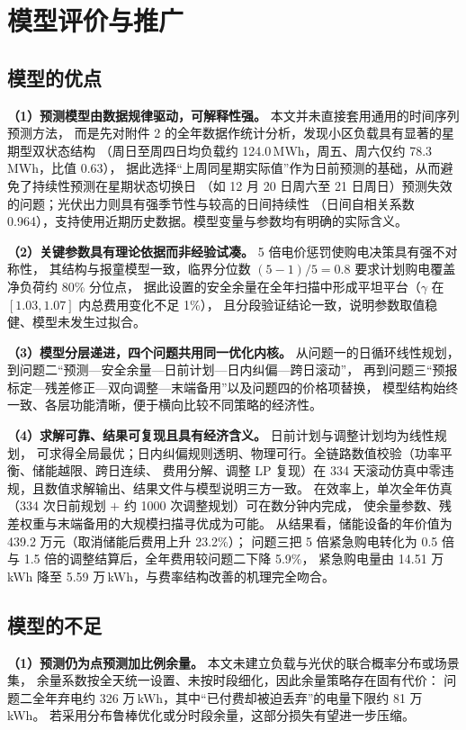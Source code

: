 \section{模型评价与推广}

\subsection{模型的优点}

\textbf{（1）预测模型由数据规律驱动，可解释性强。} 本文并未直接套用通用的时间序列预测方法，
而是先对附件 2 的全年数据作统计分析，发现小区负载具有显著的星期型双状态结构
（周日至周四日均负载约 124.0\,MWh，周五、周六仅约 78.3\,MWh，比值 0.63），
据此选择“上周同星期实际值”作为日前预测的基础，从而避免了持续性预测在星期状态切换日
（如 12 月 20 日周六至 21 日周日）预测失效的问题；光伏出力则具有强季节性与较高的日间持续性
（日间自相关系数 0.964），支持使用近期历史数据。模型变量与参数均有明确的实际含义。

\textbf{（2）关键参数具有理论依据而非经验试凑。} 5 倍电价惩罚使购电决策具有强不对称性，
其结构与报童模型一致，临界分位数 $(5-1)/5=0.8$ 要求计划购电覆盖净负荷约 80\% 分位点，
据此设置的安全余量在全年扫描中形成平坦平台（$\gamma$ 在 $[1.03,1.07]$ 内总费用变化不足 1\%），
且分段验证结论一致，说明参数取值稳健、模型未发生过拟合。

\textbf{（3）模型分层递进，四个问题共用同一优化内核。} 从问题一的日循环线性规划，
到问题二“预测—安全余量—日前计划—日内纠偏—跨日滚动”，
再到问题三“预报标定—残差修正—双向调整—末端备用”以及问题四的价格项替换，
模型结构始终一致、各层功能清晰，便于横向比较不同策略的经济性。

\textbf{（4）求解可靠、结果可复现且具有经济含义。} 日前计划与调整计划均为线性规划，
可求得全局最优；日内纠偏规则透明、物理可行。全链路数值校验（功率平衡、储能越限、跨日连续、
费用分解、调整 LP 复现）在 334 天滚动仿真中零违规，且数值求解输出、结果文件与模型说明三方一致。
在效率上，单次全年仿真（334 次日前规划 $+$ 约 1000 次调整规划）可在数分钟内完成，
使余量参数、残差权重与末端备用的大规模扫描寻优成为可能。
从结果看，储能设备的年价值为 439.2 万元（取消储能后费用上升 23.2\%）；
问题三把 5 倍紧急购电转化为 0.5 倍与 1.5 倍的调整结算后，全年费用较问题二下降 5.9\%，
紧急购电量由 14.51 万\,kWh 降至 5.59 万\,kWh，与费率结构改善的机理完全吻合。

\subsection{模型的不足}

\textbf{（1）预测仍为点预测加比例余量。} 本文未建立负载与光伏的联合概率分布或场景集，
余量系数按全天统一设置、未按时段细化，因此余量策略存在固有代价：
问题二全年弃电约 326 万\,kWh，其中“已付费却被迫丢弃”的电量下限约 81 万\,kWh。
若采用分布鲁棒优化\cite{bertsimas2013}或分时段余量，这部分损失有望进一步压缩。

